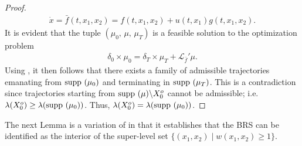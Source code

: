 \documentclass[dvipsnames]{article}
\providecommand{\supp}{\ensuremath \text{supp }}
\begin{document}
\begin{proof}
\begin{align*}
  \dot x=\bar f(t,x_1,x_2)=f(t,x_1,x_2)+u(t,x_1)g(t,x_1,x_2).
\end{align*}
It is evident that the tuple $(\mu_0,\,\mu,\,\mu_T)$ is a feasible solution to the optimization problem
\begin{align*}
  \delta_0\times \mu_0=\delta_T\times \mu_T+\mathcal L_{\bar f}'\mu.
\end{align*}
Using \cite[Lemma 3]{Henrion}, it then follows that there exists a family of admissible trajectories emanating from $\supp(\mu_0)$ and terminating in $\supp(\mu_T)$. This is a contradiction since trajectories starting from $\supp(\mu)\backslash X_0^o$ cannot be admissible; i.e. $\lambda(X_0^o)\ge \lambda(\supp(\mu_0))$. Thus, $\lambda(X^o_0)=\lambda(\supp (\mu_0))$.
\end{proof}

\justify
The next Lemma is a variation of \cite[Lemma 2]{Henrion} in that it establishes that the BRS can be identified as the interior of the super-level set $\{(x_1,x_2)\mid w(x_1,x_2)\ge 1\}$.
\end{document}
